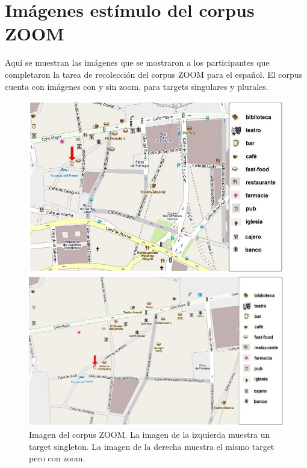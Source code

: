 \section{Im\'agenes est\'imulo del corpus ZOOM}
\label{imagenes-zoom}
Aqu\'i se muestran las im\'agenes que se mostraron a los participantes que completaron la tarea de recolecci\'on del corpus ZOOM para el espa\~nol. El corpus cuenta con im\'agenes con y sin zoom, para targets singulares y plurales. 

\begin{figure}
\begin{minipage}[ht]{0.48\linewidth}
\centering
\includegraphics[width=\textwidth]{images/corpus/mapa3.png}
\caption{}
\label{mapa1}
\end{minipage}
\hspace*{0cm}
\begin{minipage}[ht]{0.55\linewidth}
\centering
\includegraphics[width=\textwidth]{images/corpus/mapa13.png}
\caption{}
\label{mapa2}
\end{minipage}
\caption{Imagen del corpus ZOOM. La imagen de la izquierda muestra un target singleton. La imagen de la derecha muestra el mismo target pero con zoom.}
\end{figure}

